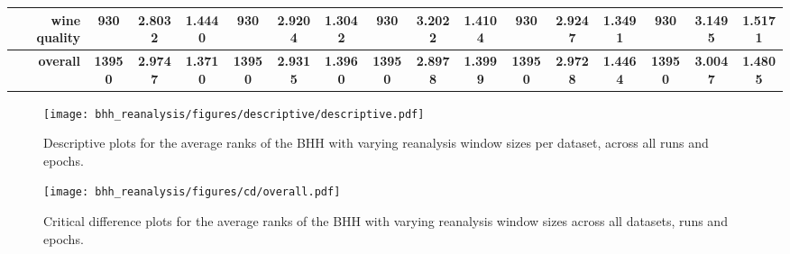 \begin{table}[htbp]
{\begin{tabular}{rccccccccccccccc}
			wine quality                        & 930                                     & \cellcolor[rgb]{ .776,  .937,  .808}\textcolor[rgb]{ 0,  .38,  0}{2.8032} & 1.4440          & 930                            & 2.9204                                                                    & 1.3042          & 930                             & 3.2022                                                                             & 1.4104          & 930                             & 2.9247                                                                    & 1.3491          & 930                             & 3.1495                                                                    & 1.5171          \\
			\midrule
			\textbf{overall}                    & \textbf{13950}                          & \textbf{2.9747}                                                           & \textbf{1.3710} & \textbf{13950}                 & \textbf{2.9315}                                                           & \textbf{1.3960} & \textbf{13950}                  & \cellcolor[rgb]{ .776,  .937,  .808}\textcolor[rgb]{ 0,  .38,  0}{\textbf{2.8978}} & \textbf{1.3999} & \textbf{13950}                  & \textbf{2.9728}                                                           & \textbf{1.4464} & \textbf{13950}                  & \textbf{3.0047}                                                           & \textbf{1.4805} \\
		\end{tabular}%
	}

\end{table}%

\begin{figure}[htbp]
	\centering
	\texttt{[image: bhh\_reanalysis/figures/descriptive/descriptive.pdf]}
	\caption{Descriptive plots for the average ranks of the \acs{BHH} with varying reanalysis window sizes per dataset, across all runs and epochs.}
	\label{fig:results:reanalysis:descriptive:descriptive}
\end{figure}


\begin{figure}[htbp]
	\centering
	\texttt{[image: bhh\_reanalysis/figures/cd/overall.pdf]}
	\caption{Critical difference plots for the average ranks of the \acs{BHH} with varying reanalysis window sizes across all datasets, runs and epochs.}
	\label{fig:results:reanalysis:descriptive:cd}
\end{figure}

